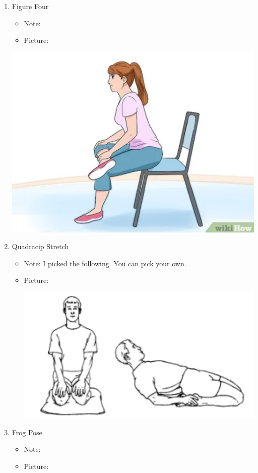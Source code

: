 \documentclass{article}
\begin{document}
\begin{enumerate}
\item Figure Four 

    \begin{itemize}

        \item Note: 

        \item Picture:

    \end{itemize}

     \includegraphics[width=.50\textwidth]{fig_four.png}

\item Quadracip Stretch

    \begin{itemize}

        \item Note: I picked the following. You can pick your own.

        \item Picture:

         \includegraphics[width=.50\textwidth]{quad_stretch.png}

    \end{itemize}

\item Frog Pose

    \begin{itemize}

        \item Note: 

        \item Picture:
            
    \end{itemize}


\end{enumerate}
\end{document}
